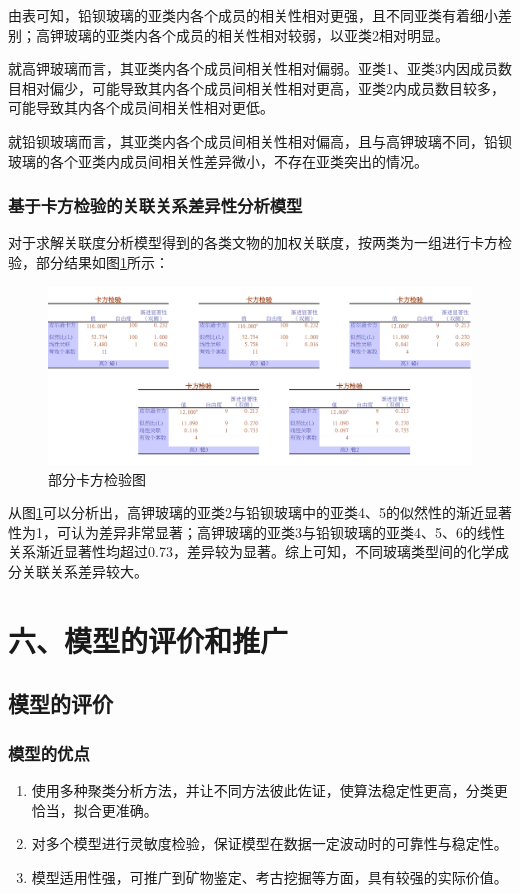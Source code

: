 \documentclass{my_paper}
\begin{document}
由表可知，铅钡玻璃的亚类内各个成员的相关性相对更强，且不同亚类有着细小差别；高钾玻璃的亚类内各个成员的相关性相对较弱，以亚类2相对明显。\par
就高钾玻璃而言，其亚类内各个成员间相关性相对偏弱。亚类1、亚类3内因成员数目相对偏少，可能导致其内各个成员间相关性相对更高，亚类2内成员数目较多，可能导致其内各个成员间相关性相对更低。\par
就铅钡玻璃而言，其亚类内各个成员间相关性相对偏高，且与高钾玻璃不同，铅钡玻璃的各个亚类内成员间相关性差异微小，不存在亚类突出的情况。
\subsubsection{基于卡方检验的关联关系差异性分析模型}
对于求解关联度分析模型得到的各类文物的加权关联度，按两类为一组进行卡方检验，部分结果如图\ref{卡方检验图}所示：

\begin{figure}[H]
    \centering
    \includegraphics[width=1\textwidth]{第四问卡方检验.png}
    \caption{部分卡方检验图}
    \label{卡方检验图}
\end{figure}

从图\ref{卡方检验图}可以分析出，高钾玻璃的亚类2与铅钡玻璃中的亚类4、5的似然性的渐近显著性为1，可认为差异非常显著；高钾玻璃的亚类3与铅钡玻璃的亚类4、5、6的线性关系渐近显著性均超过0.73，差异较为显著。综上可知，不同玻璃类型间的化学成分关联关系差异较大。

\section{六、模型的评价和推广}
\subsection{模型的评价}
\subsubsection{模型的优点}
\begin{enumerate}
    \item 使用多种聚类分析方法，并让不同方法彼此佐证，使算法稳定性更高，分类更恰当，拟合更准确。
    \item 对多个模型进行灵敏度检验，保证模型在数据一定波动时的可靠性与稳定性。
    \item 模型适用性强，可推广到矿物鉴定、考古挖掘等方面，具有较强的实际价值。
\end{enumerate}
\end{document}
